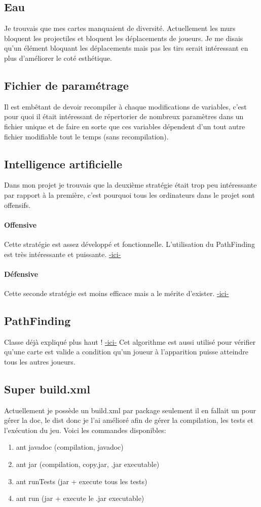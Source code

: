 \documentclass[a4paper,12pt]{article}
\begin{document}
	\subsection{Eau}
	Je trouvais que mes cartes manquaient de diversité. Actuellement les murs bloquent les projectiles et bloquent les déplacements de joueurs. Je me disais qu'un élément bloquant les déplacements mais pas les tirs serait intéressant en plus d'améliorer le coté esthétique. 
	\subsection{Fichier de paramétrage}
	Il est embêtant de devoir recompiler à chaque modifications de variables, c'est pour quoi il était intéressant de répertorier de nombreux paramètres dans un fichier unique et de faire en sorte que ces variables dépendent d'un tout autre fichier modifiable tout le temps (sans recompilation).
	\subsection{Intelligence artificielle}
	Dans mon projet je trouvais que la deuxième stratégie était trop peu intéressante par rapport à la première, c'est pourquoi tous les ordinateurs dans le projet sont offensifs. 
	\paragraph{Offensive}
	Cette stratégie est assez développé et fonctionnelle. L'utilisation du PathFinding est très intéressante et puissante.  
	\hyperref[sec:Offensive]{-ici-}
	\paragraph{Défensive}
	Cette seconde stratégie est moins efficace mais a le mérite d'exister. 
	\hyperref[sec:Défensive]{-ici-}
	\subsection{PathFinding}
	Classe déjà expliqué plus haut ! 
	\hyperref[sec:PathFinding]{-ici-}
	Cet algorithme est aussi utilisé pour vérifier qu'une carte est valide a condition qu'un joueur à l'apparition puisse atteindre tous les autres joueurs.
	\subsection{Super build.xml}
	Actuellement je possède un build.xml par package seulement il en fallait un pour gérer la doc, le dist donc je l'ai amélioré afin de gérer la compilation, les tests et l’exécution du jeu. Voici les commandes disponibles:
	\begin{enumerate}
		\item ant javadoc (compilation, javadoc)
		\item ant jar (compilation, copy.jar, .jar executable)
		\item ant runTests (jar + execute tous les tests)
		\item ant run (jar + execute le .jar executable)
	\end{enumerate}
	
\end{document}
